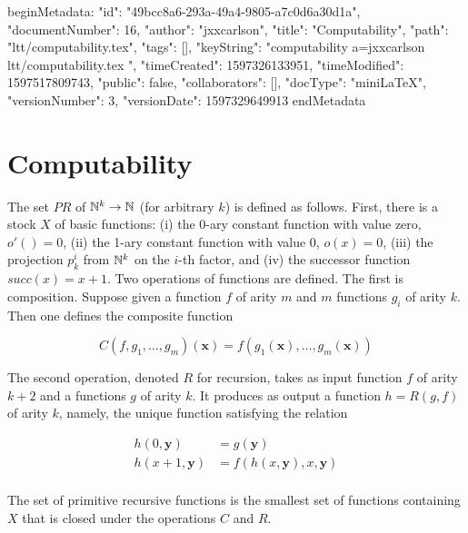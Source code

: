 beginMetadata:
{
    "id": "49bcc8a6-293a-49a4-9805-a7c0d6a30d1a",
    "documentNumber": 16,
    "author": "jxxcarlson",
    "title": "Computability",
    "path": "ltt/computability.tex",
    "tags": [],
    "keyString": "computability a=jxxcarlson ltt/computability.tex ",
    "timeCreated": 1597326133951,
    "timeModified": 1597517809743,
    "public": false,
    "collaborators": [],
    "docType": "miniLaTeX",
    "versionNumber": 3,
    "versionDate": 1597329649913
}
endMetadata

\begin{mathmacro}
\newcommand{\nat}[0]{\mathbb{N}}
\end{mathmacro}

\section{Computability}

The set $PR$ of  $\nat^k \to \nat$ (for arbitrary $k$) is defined as follows.  First, there is a stock $X$ of basic functions: (i) the 0-ary constant function with value zero, $o'() = 0$, (ii) the 1-ary constant function with value 0, $o(x) = 0$, (iii) the projection $p^i_k$ from $\nat^k$ on the $i$-th factor, and (iv) the successor function $succ(x) = x + 1$.  Two operations of functions are defined. The first is composition.  Suppose given a function $f$ of arity $m$ and $m$ functions $g_i$ of arity $k$.  Then one defines the composite function


\begin{equation}
C(f,g_1,\ldots,g_m)(\boldsymbol{x}) = f(g_1(\boldsymbol{x}), \ldots, g_m(\boldsymbol{x}))
\end{equation}

The second operation, denoted $R$ for recursion, takes as input  function $f$ of arity $k+2$ and a functions $g$ of arity $k$.  It produces as output a function $h = R(g,f)$ of arity $k$, namely, the unique function satisfying the relation

\begin{align}
  h(0, \boldsymbol{y}) &= g(\boldsymbol{y}) \\
  h(x + 1, \boldsymbol{y}) &= f(h(x,\boldsymbol{y}), x, \boldsymbol{y}) \\
\end{align}

\begin{definition}
The set of primitive recursive functions is the smallest set of functions containing $X$ that is closed under the operations $C$ and $R$.
\end{definition}

